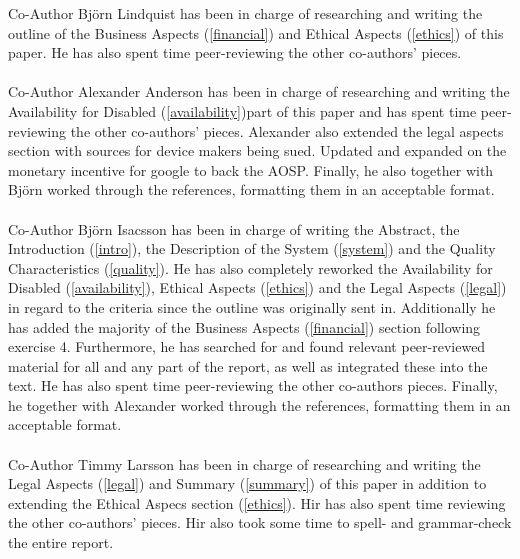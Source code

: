 \documentclass[conference]{IEEEtran}
\begin{document}
Co-Author Björn Lindquist has been in charge of researching and writing the outline of the Business Aspects (\ref{financial}) and Ethical Aspects (\ref{ethics}) of this paper. He has also spent time peer-reviewing the other co-authors' pieces.
\\\\Co-Author Alexander Anderson has been in charge of researching and writing the Availability for Disabled (\ref{availability})part of this paper and has spent time peer-reviewing the other co-authors' pieces. Alexander also extended the legal aspects section with sources for device makers being sued. Updated and expanded on the monetary incentive for google to back the AOSP. Finally, he also together with Björn worked through the references, formatting them in an acceptable format. 
\\\\Co-Author Björn Isacsson has been in charge of writing the Abstract, the Introduction (\ref{intro}), the Description of the System (\ref{system}) and the Quality Characteristics (\ref{quality}). He has also completely reworked the Availability for Disabled (\ref{availability}), Ethical Aspects (\ref{ethics}) and the Legal Aspects (\ref{legal}) in regard to the criteria since the outline was originally sent in. Additionally he has added the majority of the Business Aspects (\ref{financial}) section following exercise 4. Furthermore, he has searched for and found relevant peer-reviewed material for all and any part of the report, as well as integrated these into the text. He has also spent time peer-reviewing the other co-authors pieces. Finally, he together with Alexander worked through the references, formatting them in an acceptable format.
\\\\Co-Author Timmy Larsson has been in charge of researching and writing the Legal Aspects (\ref{legal}) and Summary (\ref{summary}) of this paper in addition to extending the Ethical Aspecs section (\ref{ethics}). Hir has also spent time reviewing the other co-authors' pieces. Hir also took some time to spell- and grammar-check the entire report.
\end{document}
